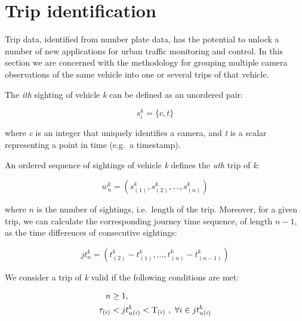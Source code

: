 \section{Trip identification}\label{s.trips}

Trip data, identified from number plate data, has the potential to unlock a number of new applications for urban traffic monitoring and control. In this section we are concerned with the methodology for grouping multiple camera observations of the same vehicle into one or several trips of that vehicle.

The \emph{ith} sighting of vehicle \emph{k} can be defined as an unordered pair:

\begin{equation} \label{e.sighting}
s^{k}_{i} = \{ c, t \}
\end{equation}

where \emph{c} is an integer that uniquely identifies a camera, and \emph{t} is a scalar representing a point in time (e.g.\ a timestamp).

An ordered sequence of sightings of vehicle \emph{k} defines the \emph{uth} trip of \emph{k}:

\begin{equation} \label{e.trip}
w^{k}_{u} = \left(s^{k}_{(1)}, s^{k}_{(2)}, \dots , s^{k}_{(n)}\right)
\end{equation}

where \( n \) is the number of sightings, i.e.\ length of the trip. Moreover, for a given trip, we can calculate the corresponding journey time sequence, of length \(n-1\), as the time differences of consecutive sightings:

\begin{equation} \label{e.journeytime}
jt^{k}_{u} = \left(t^{k}_{(2)} - t^{k}_{(1)}, \ldots, t^{k}_{(n)} - t^{k}_{(n-1)} \right)
\end{equation}

We consider a trip of \emph{k} valid if the following conditions are met:

\begin{align}
n &\ge 1 , \label{e.trip.constraints.1} \\
\tau_{(i)} &< jt^{k}_{u(i)} < \mathrm{T}_{(i)} \ , \ \forall i \in jt^{k}_{u(i)} \label{e.trip.constraints.2}
\end{align}

